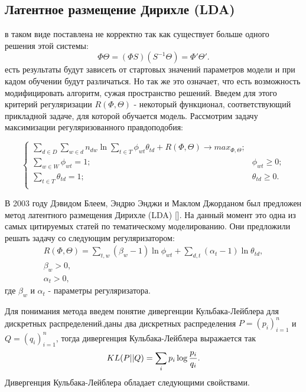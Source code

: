 \subsection{Латентное размещение Дирихле (LDA)}

 в таком виде поставлена не корректно так как существует больше одного решения этой системы:
\begin{equation}
\Phi\Theta = (\Phi S)(S^{-1}\Theta)=\Phi'\Theta'.
\end{equation}
 есть результаты будут зависеть от стартовых значений параметров модели и при кадом обучении будут различаться. Но так же это означает, что есть возможность модифицировать алгоритм, сужая пространство решений. Введем для этого критерий регуляризации $R(\Phi,\Theta)$ - некоторый функционал, соответствующий прикладной задаче, для которой обучается модель. Рассмотрим задачу максимизации регуляризованного правдоподобия:

\begin{equation}
\begin{cases}
    \sum_{d \in D} \sum_{w \in d} n_{dw} \ln{\sum_{t \in T} \phi_{wt} \theta_{td} } + R(\Phi,\Theta) \rightarrow max_{\Phi,\Theta};\\
    \sum_{w \in W}\phi_{wt} = 1; &\phi_{wt} \ge 0;\\
    \sum_{t \in T}\theta_{td} = 1; &\theta_{td} \ge 0.\\
\end{cases}
\end{equation}

В 2003 году Дэвидом Блеем, Эндрю Энджи и Маклом Джорданом был предложен метод латентного размещения Дирихле (LDA) [\todo{}]. На данный момент это одна из самых цитируемых статей по тематическому моделированию. Они предложили решать задачу со следующим регуляризатором:
\begin{equation}
\begin{aligned}
R(\Phi,\Theta) = \sum_{t,w}{(\beta_w-1)\ln{\phi_{wt}}} + \sum_{d,t}{(\alpha_t-1)\ln{\theta_{td}}},\\
\beta_w > 0, \\
\alpha_t > 0,
\end{aligned}
\end{equation}
где $\beta_w$ и $\alpha_t$ - параметры регуляризатора.

Для понимания метода введем понятие дивергенции Кульбака-Лейблера для дискретных распределений. даны два дискретных распределения $P=(p_i)_{i=1}^n$ и $Q=(q_i)_{i=1}^n$, тогда дивергенция Кульбака-Лейблера выражается так
\begin{equation}
KL(P||Q)=\sum_i{p_i \log{{p_i}\over{q_i}}}.
\end{equation}
Дивергенция Кульбака-Лейблера обладает следующими свойствами.

